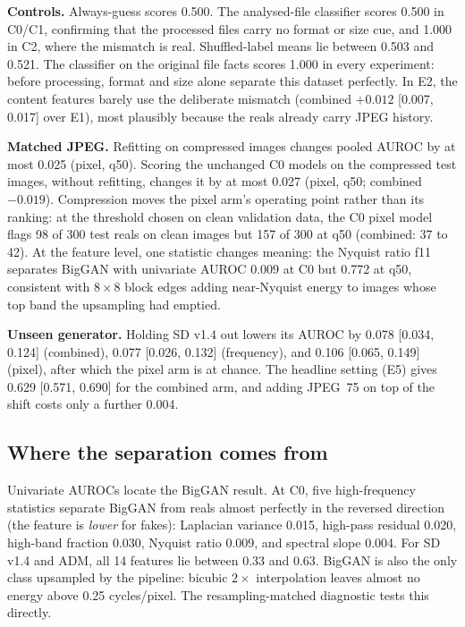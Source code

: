 \documentclass[conference]{IEEEtran}
\begin{document}
\textbf{Controls.} Always-guess scores 0.500. The analysed-file classifier scores 0.500 in C0/C1, confirming that the processed files carry no format or size cue, and 1.000 in C2, where the mismatch is real. Shuffled-label means lie between 0.503 and 0.521. The classifier on the original file facts scores 1.000 in every experiment: before processing, format and size alone separate this dataset perfectly. In E2, the content features barely use the deliberate mismatch (combined $+0.012$ [0.007, 0.017] over E1), most plausibly because the reals already carry JPEG history.

\textbf{Matched JPEG.} Refitting on compressed images changes pooled AUROC by at most 0.025 (pixel, q50). Scoring the unchanged C0 models on the compressed test images, without refitting, changes it by at most 0.027 (pixel, q50; combined $-0.019$). Compression moves the pixel arm's operating point rather than its ranking: at the threshold chosen on clean validation data, the C0 pixel model flags 98 of 300 test reals on clean images but 157 of 300 at q50 (combined: 37 to 42). At the feature level, one statistic changes meaning: the Nyquist ratio f11 separates BigGAN with univariate AUROC 0.009 at C0 but 0.772 at q50, consistent with $8\times8$ block edges adding near-Nyquist energy to images whose top band the upsampling had emptied.

\textbf{Unseen generator.} Holding SD v1.4 out lowers its AUROC by 0.078 [0.034, 0.124] (combined), 0.077 [0.026, 0.132] (frequency), and 0.106 [0.065, 0.149] (pixel), after which the pixel arm is at chance. The headline setting (E5) gives 0.629 [0.571, 0.690] for the combined arm, and adding JPEG~75 on top of the shift costs only a further 0.004.

\subsection{Where the separation comes from}
Univariate AUROCs locate the BigGAN result. At C0, five high-frequency statistics separate BigGAN from reals almost perfectly in the reversed direction (the feature is \emph{lower} for fakes): Laplacian variance 0.015, high-pass residual 0.020, high-band fraction 0.030, Nyquist ratio 0.009, and spectral slope 0.004. For SD v1.4 and ADM, all 14 features lie between 0.33 and 0.63. BigGAN is also the only class upsampled by the pipeline: bicubic $2\times$ interpolation leaves almost no energy above 0.25 cycles/pixel. The resampling-matched diagnostic tests this directly.
\end{document}
